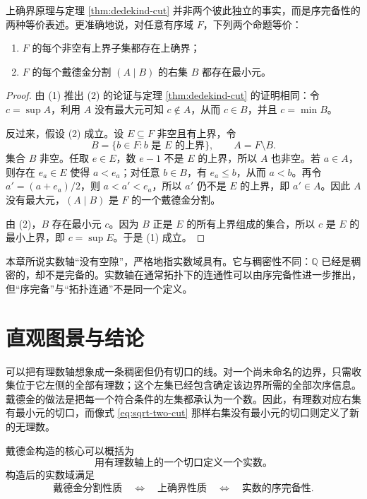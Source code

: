 \documentclass[UTF8,12pt,a4paper,fontset=fandol]{ctexbook}
\begin{document}
\begin{proposition}[两种完备性表述的等价性]
上确界原理与定理 \ref{thm:dedekind-cut} 并非两个彼此独立的事实，而是序完备性的两种等价表述。更准确地说，对任意有序域 $F$，下列两个命题等价：
\begin{enumerate}[label=(\arabic*)]
  \item $F$ 的每个非空有上界子集都存在上确界；
  \item $F$ 的每个戴德金分割 $(A\mid B)$ 的右集 $B$ 都存在最小元。
\end{enumerate}
\end{proposition}

\begin{proof}
由 (1) 推出 (2) 的论证与定理 \ref{thm:dedekind-cut} 的证明相同：令 $c=\sup A$，利用 $A$ 没有最大元可知 $c\notin A$，从而 $c\in B$，并且 $c=\min B$。

反过来，假设 (2) 成立。设 $E\subseteq F$ 非空且有上界，令
\[
  B=\{b\in F:b\text{ 是 }E\text{ 的上界}\},
  \qquad A=F\setminus B.
\]
集合 $B$ 非空。任取 $e\in E$，数 $e-1$ 不是 $E$ 的上界，所以 $A$ 也非空。若 $a\in A$，则存在 $e_a\in E$ 使得 $a<e_a$；对任意 $b\in B$，有 $e_a\le b$，从而 $a<b$。再令 $a'=(a+e_a)/2$，则 $a<a'<e_a$，所以 $a'$ 仍不是 $E$ 的上界，即 $a'\in A$。因此 $A$ 没有最大元，$(A\mid B)$ 是 $F$ 的一个戴德金分割。

由 (2)，$B$ 存在最小元 $c$。因为 $B$ 正是 $E$ 的所有上界组成的集合，所以 $c$ 是 $E$ 的最小上界，即 $c=\sup E$。于是 (1) 成立。
\end{proof}

\begin{remark}[“连续”一词的含义]
本章所说实数轴“没有空隙”，严格地指实数域具有。它与稠密性不同：$\mathbb{Q}$ 已经是稠密的，却不是完备的。实数轴在通常拓扑下的连通性可以由序完备性进一步推出，但“序完备”与“拓扑连通”不是同一个定义。
\end{remark}

\section{直观图景与结论}

可以把有理数轴想象成一条稠密但仍有切口的线。对一个尚未命名的边界，只需收集位于它左侧的全部有理数；这个左集已经包含确定该边界所需的全部次序信息。戴德金的做法是把每一个符合条件的左集都承认为一个数。因此，有理数对应右集有最小元的切口，而像式 \eqref{eq:sqrt-two-cut} 那样右集没有最小元的切口则定义了新的无理数。

戴德金构造的核心可以概括为
\[
  \boxed{\text{用有理数轴上的一个切口定义一个实数。}}
\]
构造后的实数域满足
\[
  \boxed{\text{戴德金分割性质}
  \quad\Longleftrightarrow\quad
  \text{上确界性质}
  \quad\Longleftrightarrow\quad
  \text{实数的序完备性}.}
\]
\end{document}
